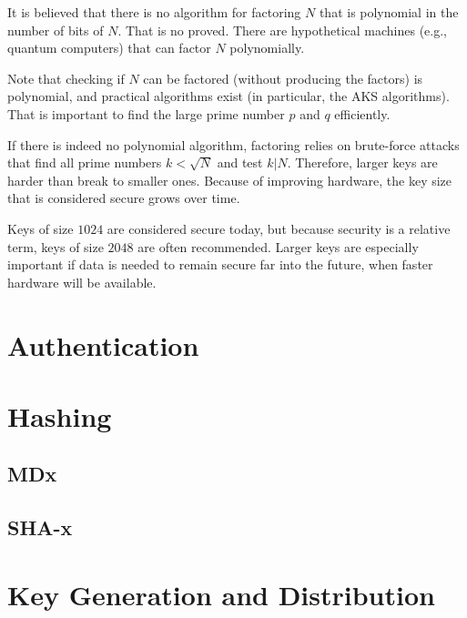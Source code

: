 It is believed that there is no algorithm for factoring $N$ that is polynomial in the number of bits of $N$.
That is no proved.
There are hypothetical machines (e.g., quantum computers) that can factor $N$ polynomially.

Note that checking if $N$ can be factored (without producing the factors) is polynomial, and practical algorithms exist (in particular, the AKS algorithms).
That is important to find the large prime number $p$ and $q$ efficiently.
\medskip

If there is indeed no polynomial algorithm, factoring relies on brute-force attacks that find all prime numbers $k<\sqrt{N}$ and test $k|N$.
Therefore, larger keys are harder than break to smaller ones.
Because of improving hardware, the key size that is considered secure grows over time.

Keys of size $1024$ are considered secure today, but because security is a relative term, keys of size $2048$ are often recommended.
Larger keys are especially important if data is needed to remain secure far into the future, when faster hardware will be available.

\section{Authentication}

\section{Hashing}

\subsection{MDx}

\subsection{SHA-x}

\section{Key Generation and Distribution}